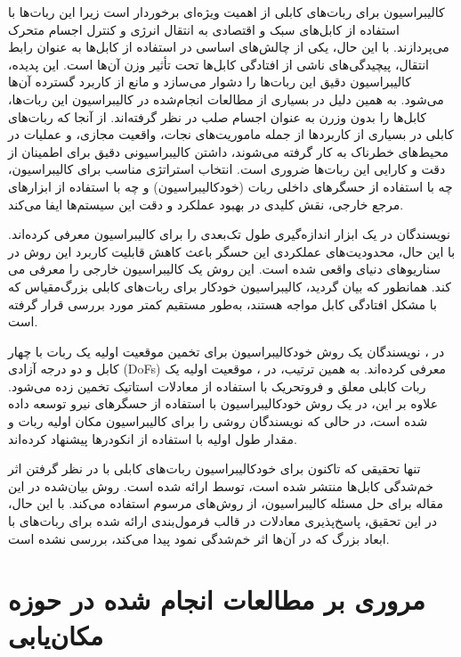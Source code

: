  کالیبراسیون برای ربات‌های کابلی از اهمیت ویژه‌ای برخوردار است زیرا این ربات‌ها با استفاده از کابل‌های سبک و اقتصادی به انتقال انرژی و کنترل اجسام متحرک می‌پردازند. با این حال، یکی از چالش‌های اساسی در استفاده از کابل‌ها به عنوان رابط انتقال، پیچیدگی‌های ناشی از افتادگی کابل‌ها تحت تأثیر وزن آن‌ها است. این پدیده، کالیبراسیون دقیق این ربات‌ها را دشوار می‌سازد و مانع از کاربرد گسترده آن‌ها می‌شود. به همین دلیل در بسیاری از مطالعات انجام‌شده در کالیبراسیون این ربات‌ها، کابل‌ها را بدون وزرن به عنوان اجسام صلب در نظر گرفته‌اند. از آنجا که ربات‌های کابلی در بسیاری از کاربردها از جمله ماموریت‌های نجات، واقعیت مجازی، و عملیات در محیط‌های خطرناک به کار گرفته می‌شوند، داشتن کالیبراسیونی دقیق برای اطمینان از دقت و کارایی این ربات‌ها ضروری است. انتخاب استراتژی مناسب برای کالیبراسیون، چه با استفاده از حسگرهای داخلی ربات (خودکالیبراسیون) و چه با استفاده از ابزارهای مرجع خارجی، نقش کلیدی در بهبود عملکرد و دقت این سیستم‌ها ایفا می‌کند. 
 
نویسندگان در \cite{jin2018geometric} یک ابزار اندازه‌گیری طول تک‌بعدی را برای کالیبراسیون معرفی کرده‌اند. با این حال، محدودیت‌های عملکردی این حسگر باعث کاهش قابلیت کاربرد این روش در سناریوهای دنیای واقعی شده است. این روش یک کالیبراسیون خارجی را معرفی می کند. همانطور که بیان گردید، کالیبراسیون خودکار برای ربات‌های کابلی بزرگ‌مقیاس که با مشکل افتادگی کابل مواجه هستند، به‌طور مستقیم کمتر مورد بررسی قرار گرفته است. 

در \cite{borgstrom2009nims}، نویسندگان یک روش خودکالیبراسیون برای تخمین موقعیت اولیه یک ربات با چهار کابل و دو درجه آزادی (DoFs) معرفی کرده‌اند. به همین ترتیب، در \cite{ida2019automatic}، موقعیت اولیه یک ربات کابلی معلق و فروتحریک با استفاده از معادلات استاتیک تخمین زده می‌شود. علاوه بر این، در \cite{pott2013cable_ForceSensorCalib} یک روش خودکالیبراسیون با استفاده از حسگرهای نیرو توسعه داده شده است، در حالی که نویسندگان \cite{darvin2018initial} روشی را برای کالیبراسیون مکان اولیه ربات و مقدار طول اولیه با استفاده از انکودرها پیشنهاد کرده‌اند. 
 
تنها تحقیقی که تاکنون برای خودکالیبراسیون ربات‌های کابلی با در نظر گرفتن اثر خم‌شدگی کابل‌ها منتشر شده است، توسط \cite{an2022all} ارائه شده است. روش بیان‌شده در این مقاله برای حل مسئله کالیبراسیون، از روش‌های مرسوم استفاده می‌کند. با این حال، در این تحقیق، پاسخ‌پذیری معادلات در قالب فرمول‌بندی ارائه شده برای ربات‌های با ابعاد بزرگ که در آن‌ها اثر خم‌شدگی نمود پیدا می‌کند، بررسی نشده است.







\section{مروری بر مطالعات انجام شده در حوزه مکان‌یابی} 

